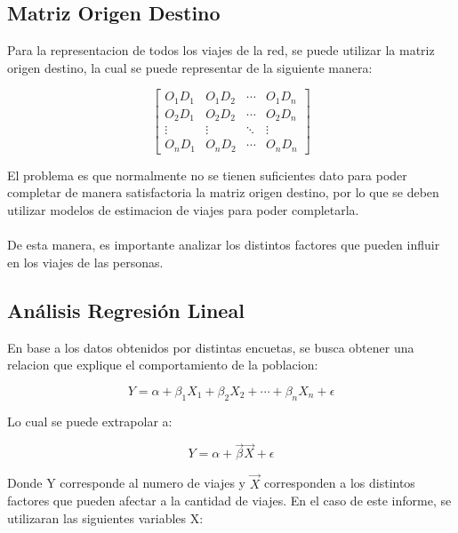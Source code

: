 \documentclass[12pt]{article} %
\begin{document}
\subsection{Matriz Origen Destino}

Para la representacion de todos los viajes de la red, se puede utilizar la matriz origen destino, la cual se puede representar de la siguiente manera:

\begin{equation}
    \begin{bmatrix}
        O_{1}D_{1} & O_{1}D_{2} & \cdots & O_{1}D_{n} \\
        O_{2}D_{1} & O_{2}D_{2} & \cdots & O_{2}D_{n} \\
        \vdots & \vdots & \ddots & \vdots \\
        O_{n}D_{1} & O_{n}D_{2} & \cdots & O_{n}D_{n}
    \end{bmatrix}
\end{equation}

El problema es que normalmente no se tienen suficientes dato para poder completar de manera satisfactoria la matriz origen destino, por lo que se deben utilizar modelos de estimacion de viajes para poder completarla.
\\ \\
De esta manera, es importante analizar los distintos factores que pueden influir en los viajes de las personas.

\subsection{Análisis Regresión Lineal}

En base a los datos obtenidos por distintas encuetas, se busca obtener una relacion que explique el comportamiento de la poblacion:

\begin{equation}
    Y = \alpha + \beta_{1}X_{1} + \beta_{2}X_{2} + \cdots + \beta_{n}X_{n} + \epsilon
\end{equation}

Lo cual se puede extrapolar a:

\begin{equation}
    Y = \alpha + \vec{\beta}\vec{X} + \epsilon
\end{equation}

Donde Y corresponde al numero de viajes y $\vec{X}$ corresponden a los distintos factores que pueden afectar a la cantidad de viajes. En el caso de este informe, se utilizaran las siguientes variables X:
\end{document}
